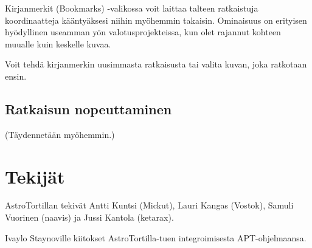 \documentclass{article}
\begin{document}
Kirjanmerkit (Bookmarks) -valikossa voit laittaa talteen ratkaistuja koordinaatteja kääntyäksesi niihin myöhemmin takaisin.
Ominaisuus on erityisen hyödyllinen useamman yön valotusprojekteissa, kun olet rajannut kohteen muualle kuin keskelle kuvaa.

Voit tehdä kirjanmerkin uusimmasta ratkaisusta tai valita kuvan, joka ratkotaan ensin.

\subsection{Ratkaisun nopeuttaminen}

(Täydennetään myöhemmin.)

\section{Tekijät}

AstroTortillan tekivät Antti Kuntsi (Mickut), Lauri Kangas (Vostok), Samuli Vuorinen (naavis) ja Jussi Kantola (ketarax).

Ivaylo Staynoville kiitokset AstroTortilla-tuen integroimisesta APT-ohjelmaansa.
\end{document}
